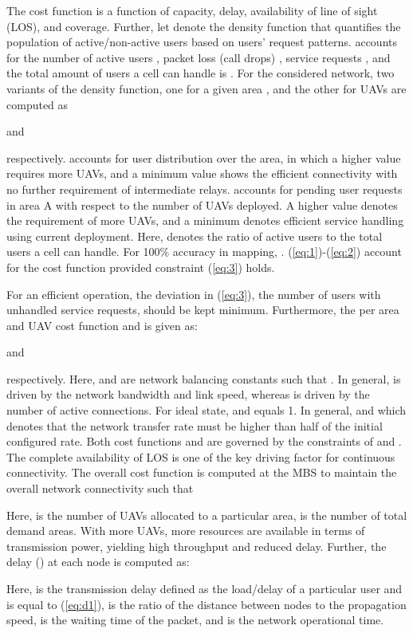 \documentclass[journal]{IEEEtran}
\begin{document}
The cost function is a function of capacity, delay, availability of line of sight (LOS), and coverage. Further, let  denote the density function that quantifies the population of active/non-active users based on users' request patterns.  accounts for the number of active users , packet loss (call drops) , service requests , and the total amount of users a cell can handle is . For the considered network, two variants of the density function, one for a given area , and the other for UAVs  are computed as

and

respectively.  accounts for user distribution over the area, in which a higher value requires more UAVs, and a minimum value shows the efficient connectivity with no further requirement of intermediate relays.  accounts for pending user requests in area A with respect to the number of UAVs deployed. A higher value denotes the requirement of more UAVs, and a minimum denotes efficient service handling using current deployment. Here,  denotes the ratio of active users to the total users a cell can handle. For 100\% accuracy in mapping, . (\ref{eq:1})-(\ref{eq:2}) account for the cost function provided constraint (\ref{eq:3}) holds.

For an efficient operation, the deviation in (\ref{eq:3}), the number of users with unhandled service requests, should be kept minimum. Furthermore, the per area and UAV cost function  and  is given as:

and

respectively. Here,  and  are network balancing constants such that . In general,  is driven by the network bandwidth and link speed, whereas  is driven by the number of active connections. For ideal state,  and  equals 1. In general,  and  which denotes that the network transfer rate must be higher than half of the initial configured rate. Both cost functions  and  are governed by the constraints of  and . The complete availability of LOS is one of the key driving factor for continuous connectivity. The overall cost function  is computed at the MBS to maintain the overall network connectivity such that

Here,  is the number of UAVs allocated to a particular area,  is the number of total demand areas. With more UAVs, more resources are available in terms of transmission power, yielding high throughput and reduced delay. Further, the delay () at each node is computed as:

Here,  is the transmission delay defined as the load/delay of a particular user and is equal to  (\ref{eq:d1}),  is the ratio of the distance between nodes to the propagation speed,  is the waiting time of the packet, and  is the network operational time.
\end{document}
